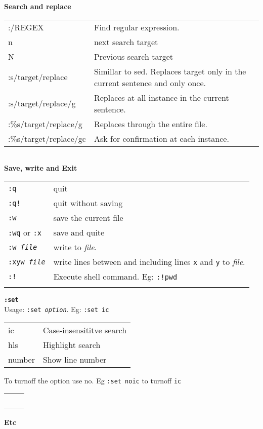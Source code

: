 \textbf{Search and replace}\\

\begin{tabularx}{\linewidth}{lX}
:/REGEX & Find regular expression.\\
n & next search target\\
N & Previous search target\\
:s/target/replace & Simillar to sed. Replaces target only in the current sentence and only once.\\
:s/target/replace/g & Replaces at all instance in the current sentence.\\
:\%s/target/replace/g & Replaces through the entire file.\\
:\%s/target/replace/gc & Ask for confirmation at each instance.\\

\end{tabularx}

\begin{tabularx}{\linewidth}{lX}
\hline
\end{tabularx}

\textbf{Save, write and Exit}

\begin{tabularx}{\linewidth}{lX}
\texttt{:q} & quit\\
\texttt{:q!} & quit without saving\\
\texttt{:w} & save the current file\\
\texttt{:wq} or \texttt{:x} & save and quite \\
\texttt{:w \textit{file}} & write to \textit{file}.\\
\texttt{:xyw \textit{file}} & write lines between and including lines \texttt{x} and \texttt{y} to \textit{file}.\\
\texttt{:!} & Execute shell command. Eg: \texttt{:!pwd}\\
\hline\\

\end{tabularx}

\textbf{\texttt{:set}}\\
Usage: \texttt{:set \textit{option}}. Eg: \texttt{:set ic}
\begin{tabularx}{\linewidth}{lX}
ic & Case-insensititve search\\
hls & Highlight search\\
number & Show line number \\
\end{tabularx}
To turnoff the option use no. Eg \texttt{:set noic} to turnoff \texttt{ic}\\
\begin{tabularx}{\linewidth}{lX}
\hline\
\end{tabularx}
\textbf{Etc}

